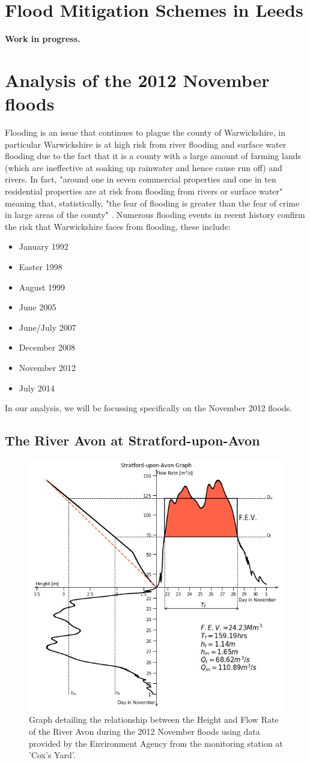 \documentclass[11 pt, a4paper]{article}
\begin{document}
\newpage
\section{Flood Mitigation Schemes in Leeds}
{\bf Work in progress.}

\newpage
\section{Analysis of the 2012 November floods}
Flooding is an issue that continues to plague the county of Warwickshire, in particular Warwickshire is at high risk from river flooding and surface water flooding due to the fact that it is a county with a large amount of farming lands (which are ineffective at soaking up rainwater and hence cause run off) and rivers. In fact, "around one in seven commercial properties and one in ten residential properties are at risk from flooding from rivers or surface water" \cite{5} meaning that, statistically, "the fear of flooding is greater than the fear of crime in large areas of the county" \cite{5}. Numerous flooding events in recent history confirm the risk that Warwickshire faces from flooding, these include:
\begin{itemize}
\item January 1992
\item Easter 1998
\item August 1999
\item June 2005
\item June/July 2007
\item December 2008
\item November 2012
\item July 2014
\end{itemize}
In our analysis, we will be focussing specifically on the November 2012 floods.

\subsection{The River Avon at Stratford-upon-Avon}
\begin{figure}[H]
\begin{center}
\includegraphics[width=.5\linewidth]{Stratford-Quadrant_Graph.png}
\caption{Graph detailing the relationship between the Height and Flow Rate of the River Avon during the 2012 November floods using data provided by the Environment Agency from the monitoring station at 'Cox's Yard'.}
\end{center}
\end{figure}
\end{document}
